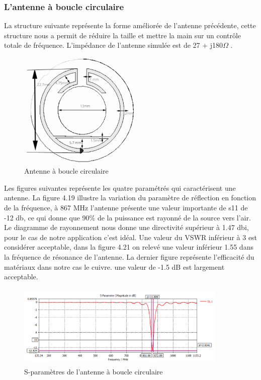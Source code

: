 \documentclass[11pt, a4paper, twoside]{book}
\begin{document}
\subsubsection{L'antenne à boucle circulaire}
La structure suivante représente  la forme améliorée de l'antenne précédente, cette structure nous a permit de réduire la taille et mettre la main sur un contrôle totale de fréquence. L'impédance de l'antenne simulée est  de 27 + j180\(\Omega\)
.
\begin{figure}[H]
\centering
\includegraphics[width=6cm]{1STee}
\caption{Antenne à boucle circulaire}
\end{figure}

Les figures suivantes représente les quatre paramétrés qui caractérisent une antenne. La figure 4.19 illustre
la variation du paramètre de réflection en fonction de la fréquence, à 867 MHz l'antenne présente une valeur importante de s11 de -12 db, ce qui donne que 90\% de la puissance est rayonné de la source vers l'air. Le diagramme de rayonnement  nous donne une directivité supérieur à 1.47 dbi, pour le cas de notre application c'est idéal. Une valeur du VSWR inférieur à 3 est  considérer acceptable, dans la figure 4.21  on relevé une valeur inférieur 1.55 dans la fréquence de résonance  de l'antenne. La dernier figure représente l'efficacité du matériaux dans notre cas le cuivre. une valeur de -1.5 dB est largement acceptable.

\begin{figure}[H]
\centering
\includegraphics[width=10cm,height=4cm]{claaaass11}
\caption{S-paramètres de l'antenne à  boucle circulaire}
\end{figure} 
\end{document}
